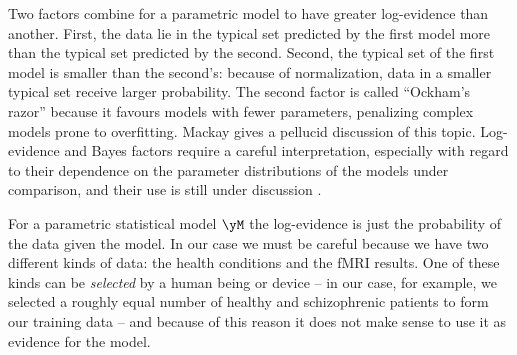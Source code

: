 Two factors combine for a parametric model to have greater log-evidence than
another. First, the data lie in the typical set \citep[see][\sect~3.1 for a
more formal definition]{coveretal1991_r2006} predicted by the first model
more than the typical set predicted by the second. Second, the typical set
of the first model is smaller than the second's: because of normalization,
data in a smaller typical set receive larger probability. The second factor
is called \enquote{Ockham's razor} because it favours models with fewer
parameters, penalizing complex models prone to overfitting. Mackay
 gives a pellucid discussion of this topic.
Log-evidence and Bayes factors require a careful interpretation, especially
with regard to their dependence on the parameter distributions of the models
under comparison, and their use is still under discussion
\citep{lindleyetal1982,kassetal1995,bergeretal1996,bergeretal1998,portamana2017c}.



For a parametric statistical model $\yM$ the log-evidence is just the
probability of the data given the model. In our case we must be careful
because we have two different kinds of data: the health conditions and the
fMRI  results. One of these kinds can be \emph{selected} by a human
being or device -- in our case, for example, we selected a roughly equal
number of healthy and schizophrenic patients to form our training data --
and because of this reason it does not make sense to use it as evidence for
the model.

